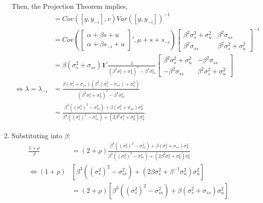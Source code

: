 \documentclass{scrartcl}
\newcommand{\rb}[1]{\ensuremath{\left(#1\right)}}
\newcommand{\sqb}[1]{\ensuremath{\left[#1\right]}}
\def\chil{\ensuremath{\rho}}
\begin{document}
\begin{enumerate}
				Then, the Projection Theorem implies,
				\begin{align*}
					[\lambda, \lambda_{-i}] &= Cov\rb{[y,y_{-i}],v} Var\rb{[y,y_{-i}]}^{-1}\\[.6em]
											&= Cov\rb{\sqb{\begin{matrix} \alpha + \beta s + u \\ \alpha + \beta s_{-i} + u \end{matrix}}',\mu + s + s_{-i}}
												 \sqb{\begin{matrix} \beta^2 \sigma_s^2 + \sigma_u^2 & \beta^2 \sigma_{ss} \\ 
												\beta^2 \sigma_{ss} &  \beta^2 \sigma_s^2 + \sigma_u^2 \end{matrix} }^{-1} \\[.6em]
											&= \beta\rb{\sigma_s^2 + \sigma_{ss}} \mathbf{1}' \frac{1}{\rb{\beta^2 \sigma_s^2 + \sigma_u^2}^2 - \beta^4 \sigma_{ss}^2}
												\sqb{\begin{matrix}
																									\beta^2 \sigma_s^2 + \sigma_u^2 & -\beta^2 \sigma_{ss} \\
																									-\beta^2 \sigma_{ss} & \beta^2 \sigma_s^2 + \sigma_u^2 
																								\end{matrix}} \\[.6em]
					\iff \lambda = \lambda_{-i} &= \frac{\beta\rb{\sigma_s^2 + \sigma_{ss}}\rb{\beta^2 \rb{\sigma_s^2 - \sigma_{ss}} + \sigma_u^2} }
														{\rb{\beta^2 \sigma_s^2 + \sigma_u^2}^2 - \beta^4 \sigma_{ss}^2}\\[.6em]
												&= \frac{\beta^3\rb{\rb{\sigma_s^2}^2 - \sigma_{ss}^2} + \beta\rb{\sigma_s^2 + \sigma_{ss}}\sigma_u^2 }
														{\beta^4\rb{\rb{\sigma_s^2}^2 - \sigma_{ss}^2} + \rb{2\beta^2\sigma_s^2 + \sigma_u^2} \sigma_u^2 }
				\end{align*}
				\item Substituting into $\beta$:
				\begin{align*}
					\frac{1 + \chil}{\beta} &= (2 + \chil) \frac{\beta^3\rb{\rb{\sigma_s^2}^2 - \sigma_{ss}^2} + \beta\rb{\sigma_s^2 + \sigma_{ss}}\sigma_u^2 }
																{\beta^4\rb{\rb{\sigma_s^2}^2 - \sigma_{ss}^2} + \rb{2\beta^2\sigma_s^2 + \sigma_u^2} \sigma_u^2 } \\
					\iff (1 + \chil)&\sqb{\beta^3\rb{\rb{\sigma_s^2}^2 - \sigma_{ss}^2} + \rb{2\beta\sigma_s^2 + \beta^{-1}\sigma_u^2} \sigma_u^2 }\\
									&= (2 + \chil) \sqb{\beta^3\rb{\rb{\sigma_s^2}^2 - \sigma_{ss}^2} + \beta\rb{\sigma_s^2 + \sigma_{ss}}\sigma_u^2} \\

\end{align*}
\end{enumerate}
\end{document}
